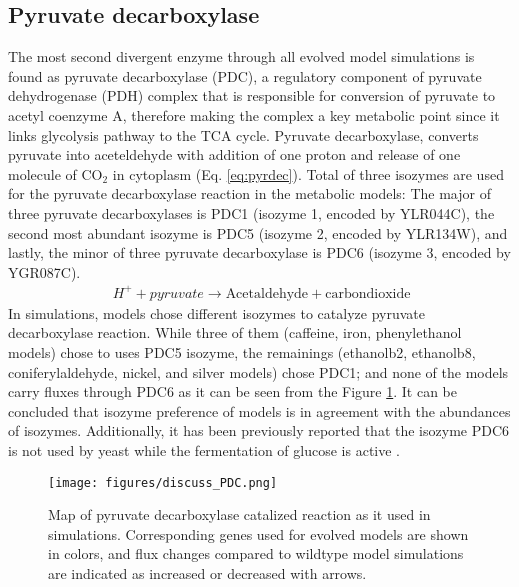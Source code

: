 \subsection{Pyruvate decarboxylase}
The most second divergent enzyme through all evolved model simulations is found as pyruvate decarboxylase (PDC), a regulatory component of pyruvate dehydrogenase (PDH) complex that is responsible for conversion of pyruvate to acetyl coenzyme A, therefore making the complex a key metabolic point since it links glycolysis pathway to the TCA cycle. Pyruvate decarboxylase, converts pyruvate into aceteldehyde with addition of one proton and release of one molecule of CO$_2$ in cytoplasm (Eq. \ref{eq:pyrdec}). Total of three isozymes are used for the pyruvate decarboxylase reaction in the metabolic models: The major of three pyruvate decarboxylases is PDC1 (isozyme 1, encoded by YLR044C), the second most abundant isozyme is PDC5 (isozyme 2, encoded by YLR134W), and lastly, the minor of three pyruvate decarboxylase is PDC6 (isozyme 3, encoded by YGR087C).
\begin{align}
\label{eq:pyrdec}
\ H^+ + pyruvate \rightarrow \text{Acetaldehyde} + \text{carbondioxide}
\end{align}
In simulations, models chose different isozymes to catalyze pyruvate decarboxylase reaction. While three of them (caffeine,  iron,  phenylethanol models) chose to uses PDC5 isozyme, the remainings (ethanolb2, ethanolb8, coniferylaldehyde, nickel, and silver models) chose PDC1; and none of the models carry fluxes through PDC6 as it can be seen from the Figure \ref{fig:discuss_PDC}. It can be concluded that isozyme preference of models is in agreement with the abundances of isozymes. Additionally, it has been previously reported that the isozyme PDC6 is not used by yeast while the fermentation of glucose is active \cite{hohmann1991pdc6}.

\begin{figure}[H]
\texttt{[image: figures/discuss\_PDC.png]}
\caption[Map of pyruvate decarboxylase catalized reaction as it used in simulations]{Map of pyruvate decarboxylase catalized reaction as it used in simulations. Corresponding genes used for evolved models are shown in colors, and flux changes compared to wildtype model simulations are indicated as increased or decreased with arrows.}
\label{fig:discuss_PDC}
\end{figure}

